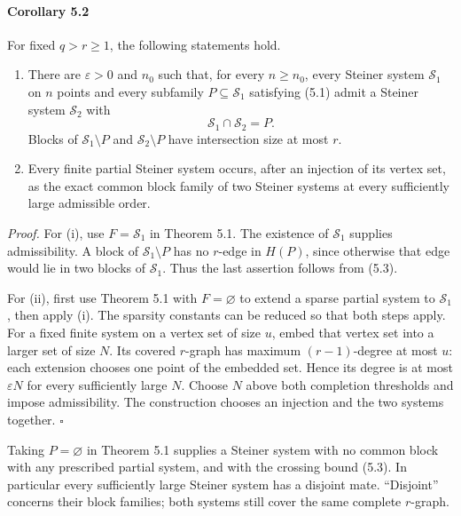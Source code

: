 \documentclass[english,11pt,a4paper]{article}
\begin{document}
\par
\begin{samepage}
\paragraph{Corollary 5.2}\label{corollary-5.2}

For fixed \(q>r\ge1\), the following statements hold.

\begin{enumerate}
\def\labelenumi{(\roman{enumi})}
\item
  There are \(\varepsilon>0\) and \(n_0\) such that, for every \(n\ge n_0\), every Steiner system \(\mathcal S_1\) on \(n\) points and every subfamily \(P\subseteq\mathcal S_1\) satisfying (5.1) admit a Steiner system \(\mathcal S_2\) with \[\mathcal S_1\cap\mathcal S_2=P.
  \tag{5.4}\] Blocks of \(\mathcal S_1\setminus P\) and \(\mathcal S_2\setminus P\) have intersection size at most \(r\).
\item
  Every finite partial Steiner system occurs, after an injection of its vertex set, as the exact common block family of two Steiner systems at every sufficiently large admissible order.
\end{enumerate}

\end{samepage}
\emph{Proof.} For (i), use \(F=\mathcal S_1\) in Theorem 5.1. The existence of \(\mathcal S_1\) supplies admissibility. A block of \(\mathcal S_1\setminus P\) has no \(r\)-edge in \(H(P)\), since otherwise that edge would lie in two blocks of \(\mathcal S_1\). Thus the last assertion follows from (5.3).

For (ii), first use Theorem 5.1 with \(F=\varnothing\) to extend a sparse partial system to \(\mathcal S_1\), then apply (i). The sparsity constants can be reduced so that both steps apply. For a fixed finite system on a vertex set of size \(u\), embed that vertex set into a larger set of size \(N\). Its covered \(r\)-graph has maximum \((r-1)\)-degree at most \(u\): each extension chooses one point of the embedded set. Hence its degree is at most \(\varepsilon N\) for every sufficiently large \(N\). Choose \(N\) above both completion thresholds and impose admissibility. The construction chooses an injection and the two systems together. \(\square\)

Taking \(P=\varnothing\) in Theorem 5.1 supplies a Steiner system with no common block with any prescribed partial system, and with the crossing bound (5.3). In particular every sufficiently large Steiner system has a disjoint mate. ``Disjoint'' concerns their block families; both systems still cover the same complete \(r\)-graph.
\end{document}
